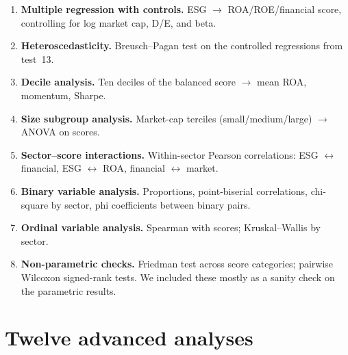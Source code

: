 \begin{enumerate}
    \item \textbf{Multiple regression with controls.} ESG $\rightarrow$ ROA/ROE/financial score, controlling for log market cap, D/E, and beta.

    \item \textbf{Heteroscedasticity.} Breusch--Pagan test on the controlled regressions from test~13.

    \item \textbf{Decile analysis.} Ten deciles of the balanced score $\rightarrow$ mean ROA, momentum, Sharpe.

    \item \textbf{Size subgroup analysis.} Market-cap terciles (small/medium/large) $\rightarrow$ ANOVA on scores.

    \item \textbf{Sector--score interactions.} Within-sector Pearson correlations: ESG $\leftrightarrow$ financial, ESG $\leftrightarrow$ ROA, financial $\leftrightarrow$ market.

    \item \textbf{Binary variable analysis.} Proportions, point-biserial correlations, chi-square by sector, phi coefficients between binary pairs.

    \item \textbf{Ordinal variable analysis.} Spearman with scores; Kruskal--Wallis by sector.

    \item \textbf{Non-parametric checks.} Friedman test across score categories; pairwise Wilcoxon signed-rank tests. We included these mostly as a sanity check on the parametric results.
\end{enumerate}

\section{Twelve advanced analyses}

